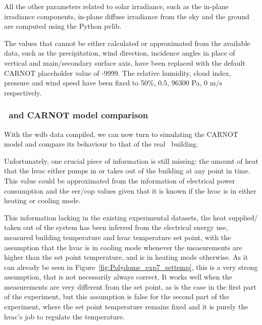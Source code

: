 All the other parameters related to solar irradiance, such as the in-plane
irradiance components, in-plane diffuse irradiance from the sky and the ground
are computed using the Python pvlib.

The values that cannot be either calculated or approximated from the available
data, such as the precipitation, wind direction, incidence angles in place of
vertical and main/secondary surface axis, have been replaced with the default
CARNOT placeholder value of -9999. The relative humidity, cloud index, pressure
and wind speed have been fixed to 50\%, 0.5, 96300 Pa, 0 $\text{m}/\text{s}$
respectively.

\subsubsection{\pdome\ and CARNOT model comparison}\label{sec:CARNOT_comparison}

With the \acrshort{wdb} data compiled, we can now turn to simulating the CARNOT
model and compare its behaviour to that of the real \pdome\ building. 

Unfortunately, one crucial piece of information is still missing: the amount of
heat that the \acrshort{hvac} either pumps in or takes out of the building at
any point in time.  This value could be approximated from the information of
electrical power consumption and the \acrshort{eer}/\acrshort{cop} values given
that it is known if the \acrshort{hvac} is in either heating or cooling mode. 

This information lacking in the existing experimental datasets, the heat
supplied/ taken out of the system has been inferred from the electrical energy
use, measured building temperature and \acrshort{hvac} temperature set point,
with the assumption that the \acrshort{hvac} is in cooling mode whenever the
measurements are higher than the set point temperature, and is in heating mode
otherwise. As it can already be seen in Figure~\ref{fig:Polydome_exp7_settemp},
this is a very strong assumption, that is not necessarily always correct. It
works well when the measurements are very different from the set point, as is
the case in the first part of the experiment, but this assumption is false for
the second part of the experiment, where the set point temperature remains fixed
and it is purely the \acrshort{hvac}'s job to regulate the temperature.

